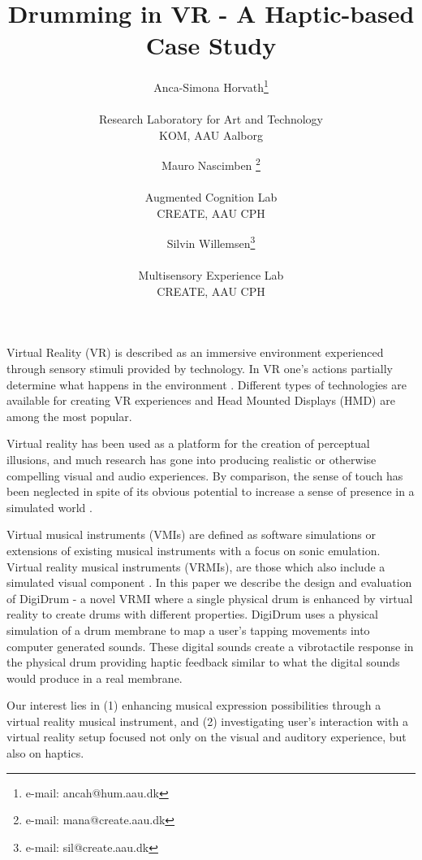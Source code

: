 \documentclass{vgtc}
\title{Drumming in VR - A Haptic-based Case Study}
\author{Anca-Simona Horvath\thanks{e-mail: ancah@hum.aau.dk}\\ %
        \parbox{1.4in}{\scriptsize \centering Research Laboratory for Art and Technology \\ KOM, AAU Aalborg} %
\and Mauro Nascimben \thanks{e-mail: mana@create.aau.dk}\\ %
     \parbox{1.4in}{\scriptsize \centering Augmented Cognition Lab \\ CREATE, AAU CPH }%
\and Silvin Willemsen\thanks{e-mail: sil@create.aau.dk}\\ %
     \parbox{1.4in}{\scriptsize \centering Multisensory Experience Lab \\ CREATE, AAU CPH}}
\begin{document}


\maketitle
Virtual Reality (VR) is described as an immersive environment experienced through sensory stimuli provided by technology. In VR one's actions partially determine what happens in the environment \cite{Serafin:2017}. Different types of technologies are available for creating VR experiences and Head Mounted Displays (HMD) are among the most popular.

Virtual reality has been used as a platform for the creation of perceptual illusions, and much research has gone into producing realistic or otherwise compelling visual and audio experiences. By comparison, the sense of touch has been neglected in spite of its obvious potential to increase a sense of presence in a simulated world \cite{Serafin:2017}.

Virtual musical instruments (VMIs) are defined as software simulations or extensions of existing musical instruments with a focus on sonic emulation. Virtual reality musical instruments (VRMIs), are those which also include a simulated visual component \cite{Serafin:2016}. In this paper we describe the design and evaluation of DigiDrum - a novel VRMI where a single physical drum is enhanced by virtual reality to create drums with different properties. DigiDrum uses a physical simulation of a drum membrane to map a user's tapping movements into computer generated sounds. These digital sounds create a vibrotactile response in the physical drum providing haptic feedback similar to what the digital sounds would produce in a real membrane.  %



Our interest lies in (1) enhancing musical expression possibilities through a virtual reality musical instrument, and (2) investigating user's interaction with a virtual reality setup focused not only on the visual and auditory experience, but also on haptics.
\end{document}
